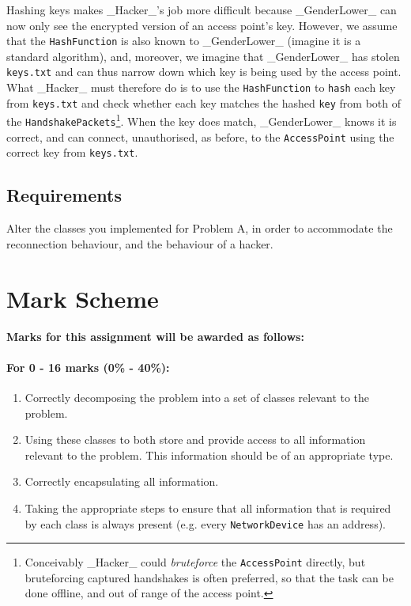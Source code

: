 \documentclass[11pt]{article}
\begin{document}
Hashing keys makes  _Hacker_'s job more difficult because _GenderLower_ can now only see the encrypted version of an access point's key. However, we assume that the \texttt{HashFunction} is also known to _GenderLower_ (imagine it is a standard algorithm), and, moreover, we imagine that _GenderLower_ has stolen \texttt{keys.txt} and can thus narrow down which key is being used by the access point. What _Hacker_ must therefore do is to use the \texttt{HashFunction} to \texttt{hash} each key from \texttt{keys.txt} and check whether each key matches the hashed \texttt{key} from both of the \texttt{HandshakePackets}\footnote{Conceivably _Hacker_ could \emph{bruteforce} the \texttt{AccessPoint} directly, but bruteforcing captured handshakes is often preferred, so that the task can be done offline, and out of range of the access point.}. When the key does match, _GenderLower_ knows it is correct, and can connect, unauthorised, as before, to the \texttt{AccessPoint} using the correct key from \texttt{keys.txt}.

\subsection{Requirements}

Alter the classes you implemented for Problem A, in order to accommodate the reconnection behaviour, and the behaviour of a hacker.

\section{Mark Scheme}

\textbf{Marks for this assignment will be awarded as follows:}

\paragraph{For 0 - 16 marks (0\% - 40\%):}
			
			\begin{enumerate}
			
				\item Correctly decomposing the problem into a set of classes relevant to the problem.
				\item Using these classes to both store and provide access to all information relevant to the problem. This information should be of an appropriate type.
				\item Correctly encapsulating all information.
				\item Taking the appropriate steps to ensure that all information that is required by each class is always present (e.g. every \texttt{NetworkDevice} has an address).
			
			\end{enumerate}
\end{document}
